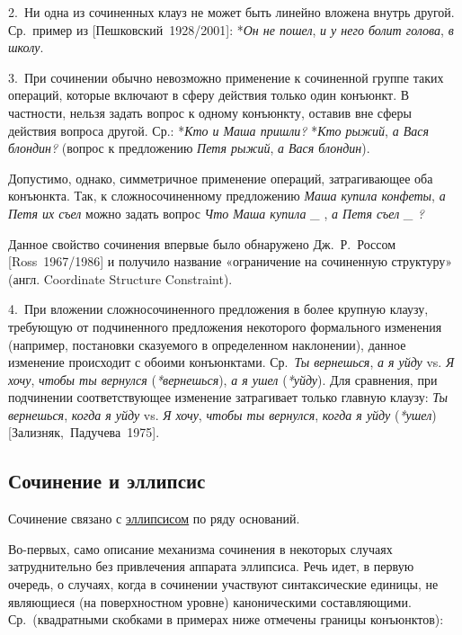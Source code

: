 2.~Ни одна из сочиненных клауз не может быть линейно вложена внутрь
другой. Ср.~пример из {[}Пешковский~1928/2001{]}: *\textit{Он не пошел},
\textit{и у него болит голова}, \textit{в школу}.

3.~При сочинении обычно невозможно применение к сочиненной группе таких
операций, которые включают в сферу действия только один конъюнкт. В
частности, нельзя задать вопрос к одному конъюнкту, оставив вне сферы
действия вопроса другой. Ср.: *\textit{Кто и Маша пришли?} *\textit{Кто
  рыжий}, \textit{а Вася блондин?} (вопрос к предложению \textit{Петя рыжий},
\textit{а Вася блондин}).

Допустимо, однако, симметричное применение операций, затрагивающее оба
конъюнкта. Так, к сложносочиненному предложению \textit{Маша купила
  конфеты}, \textit{а Петя их съел} можно задать вопрос \textit{Что Маша
  купила \_} , \textit{а Петя съел \_ ?}

Данное свойство сочинения впервые было обнаружено Дж.~Р.~Россом
{[}Ross~1967/1986{]} и получило название «ограничение на сочиненную
структуру» (англ. Coordinate Structure Constraint).

4.~При вложении сложносочиненного предложения в более крупную клаузу,
требующую от подчиненного предложения некоторого формального изменения
(например, постановки сказуемого в определенном наклонении), данное
изменение происходит с обоими конъюнктами. Ср.~\textit{Ты вернешься},
\textit{а я уйду} vs. \textit{Я хочу}, \textit{чтобы ты вернулся}
(\textit{*вернешься}), \textit{а я ушел} (\textit{*уйду}). Для сравнения, при
подчинении соответствующее изменение затрагивает только главную клаузу:
\textit{Ты вернешься}, \textit{когда я уйду} vs. \textit{Я хочу}, \textit{чтобы
  ты вернулся}, \textit{когда я уйду} (\textit{*ушел})
{[}Зализняк,~Падучева~1975{]}.

\subsection{Сочинение и
  эллипсис}\label{ux441ux43eux447ux438ux43dux435ux43dux438ux435-ux438-ux44dux43bux43bux438ux43fux441ux438ux441}

Сочинение связано с \underline{эллипсисом} по ряду оснований.

Во-первых, само описание механизма сочинения в некоторых случаях
затруднительно без привлечения аппарата эллипсиса. Речь идет, в первую
очередь, о случаях, когда в сочинении участвуют синтаксические единицы,
не являющиеся (на поверхностном уровне) каноническими составляющими.
Ср.~(квадратными скобками в примерах ниже отмечены границы конъюнктов):

